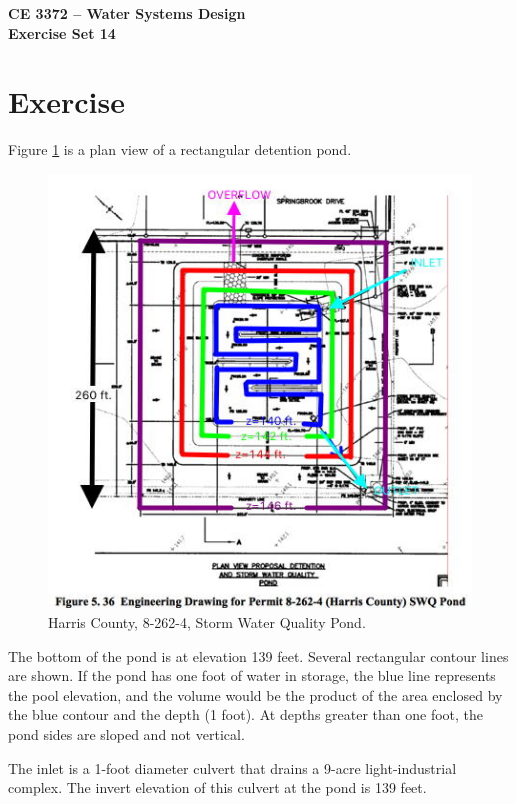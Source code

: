 \documentclass[12pt]{article}
\begin{document}
\begin{center}
{\textbf{{CE 3372 -- Water Systems Design} \\ {Exercise Set 14}}}
\end{center}

\section*{\small{Exercise}}
Figure \ref{fig:detention} is a plan view of a rectangular detention pond.   

\begin{figure}[h!] %
   \centering
   \includegraphics[width=6in]{detention.jpg} 
   \caption{Harris County, 8-262-4, Storm Water Quality Pond.}
   \label{fig:detention}
\end{figure}
\clearpage
The bottom of the pond is at elevation 139 feet.   
Several rectangular contour lines are shown.   
If the pond has one foot of water in storage, the blue line represents the pool elevation, and the volume would be the product of the area enclosed by the blue contour and the depth (1 foot).   
At depths greater than one foot, the pond sides are sloped and not vertical.

The inlet is a 1-foot diameter culvert that drains a 9-acre light-industrial complex.   
The invert elevation of this culvert at the pond is 139 feet.
\end{document}
